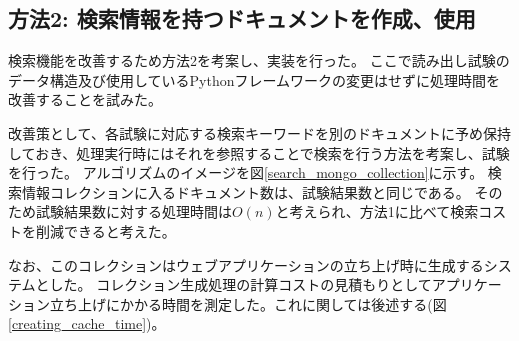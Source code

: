 \subsection{方法2: 検索情報を持つドキュメントを作成、使用}

検索機能を改善するため方法2を考案し、実装を行った。
ここで読み出し試験のデータ構造及び使用しているPythonフレームワークの変更はせずに処理時間を改善することを試みた。

改善策として、各試験に対応する検索キーワードを別のドキュメントに予め保持しておき、処理実行時にはそれを参照することで検索を行う方法を考案し、試験を行った。
アルゴリズムのイメージを図\ref{search_mongo_collection}に示す。
検索情報コレクションに入るドキュメント数は、試験結果数と同じである。
そのため試験結果数に対する処理時間は$O(n)$と考えられ、方法1に比べて検索コストを削減できると考えた。


なお、このコレクションはウェブアプリケーションの立ち上げ時に生成するシステムとした。
コレクション生成処理の計算コストの見積もりとしてアプリケーション立ち上げにかかる時間を測定した。これに関しては後述する(図\ref{creating_cache_time})。

